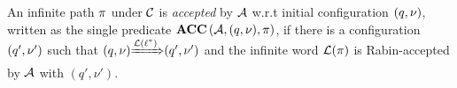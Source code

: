\vspace{-1em}
\begin{definition}\label{def:fnacc}
An infinite path $\pi$ under $\mathcal{C}$ is \emph{accepted} by $\mathcal{A}$ w.r.t
initial configuration $(q,\nu)$, written as the single predicate $\mbox{\bf ACC} \left( {\mathcal{A}}, {(q,\nu)}, {\pi} \right)$,
if there is a configuration $(q',\nu')$ such that ${(q,\nu)}{\xRightarrow{\mathcal{L}(\ell^*)}}{(q',\nu')}$ and
the infinite word $\mathcal{L}(\pi)$ is Rabin-accepted by $\mathcal{A}$ with
$
\left(q',\nu'\right)
$.
\end{definition}

